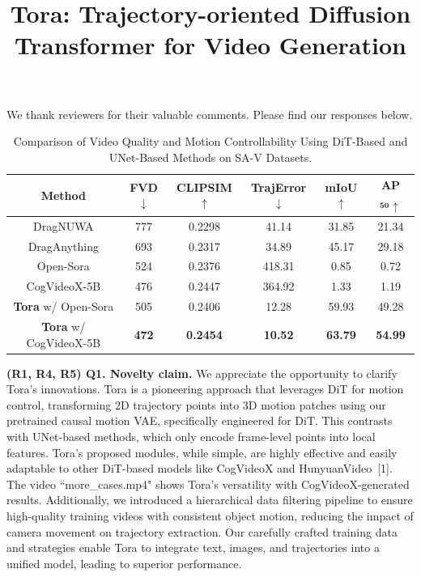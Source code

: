 \documentclass[10pt,twocolumn,letterpaper]{article}
\begin{document}
\title{Tora: Trajectory-oriented Diffusion Transformer for Video Generation}  %

\maketitle
\thispagestyle{empty}
\appendix

We thank reviewers for their valuable comments. Please find our responses below.

\setlength{\tabcolsep}{2pt}
\begin{table}[!t]\footnotesize
\centering
\begin{tabular}{cccccc}
\toprule
    \textbf{Method} & \textbf{FVD}$\downarrow$ & \textbf{CLIPSIM}$\uparrow$ & \textbf{TrajError}$\downarrow$ & \textbf{mIoU}$\uparrow$ & \textbf{AP}$_{\textbf{50}}\uparrow$  \\ 
\midrule
	DragNUWA & 777 & 0.2298 & 41.14 & 31.85 & 21.34 \\ 
	DragAnything & 693 & 0.2317 & 34.89 & 45.17 & 29.18 \\ 
	Open-Sora & 524 & 0.2376 & 418.31 & 0.85 & 0.72 \\ 
	CogVideoX-5B & 476 & 0.2447 & 364.92 & 1.33 & 1.19 \\ 
	\textbf{Tora} w/ Open-Sora & 505 & 0.2406 & 12.28 & 59.93 & 49.28 \\ 
	\textbf{Tora} w/ CogVideoX-5B & \textbf{472} & \textbf{0.2454} & \textbf{10.52} & \textbf{63.79} & \textbf{54.99} \\ 
\bottomrule
\end{tabular}
\caption{Comparison of Video Quality and Motion Controllability Using DiT-Based and UNet-Based Methods on SA-V Datasets.}
\label{t1}
\vspace{-3mm}
\end{table}

\noindent \textbf{(R1, R4, R5) Q1. Novelty claim.} We appreciate the opportunity to clarify Tora's innovations. Tora is a pioneering approach that leverages DiT for motion control, transforming 2D trajectory points into 3D motion patches using our pretrained causal motion VAE, specifically engineered for DiT. This contrasts with UNet-based methods, which only encode frame-level points into local features. Tora's proposed modules, while simple, are highly effective and easily adaptable to other DiT-based models like CogVideoX and HunyuanVideo~[1]. The video ``more\_cases.mp4" shows Tora's versatility with CogVideoX-generated results. Additionally, we introduced a hierarchical data filtering pipeline to ensure high-quality training videos with consistent object motion, reducing the impact of camera movement on trajectory extraction. Our carefully crafted training data and strategies enable Tora to integrate text, images, and trajectories into a unified model, leading to superior performance.
\end{document}
